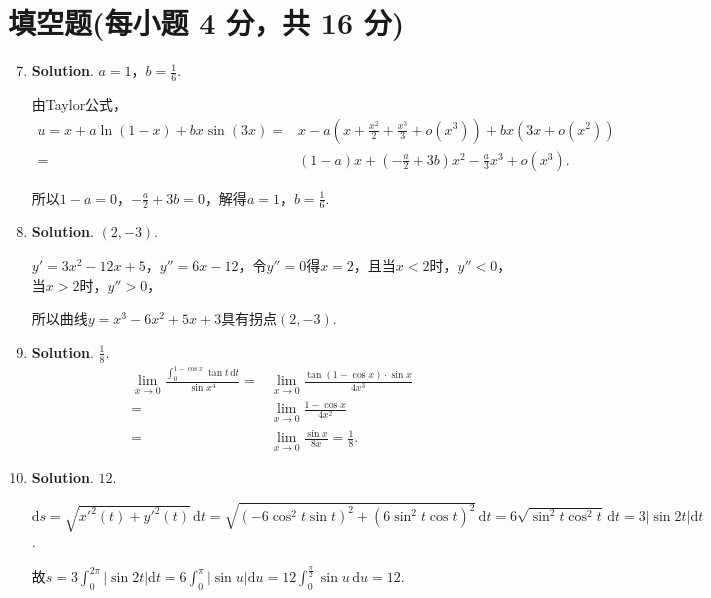 \documentclass[../Main.tex]{subfiles}
\begin{document}
\section{填空题(每小题 4 分，共 16 分)}
\begin{enumerate}
    \setcounter{enumi}{6}
    \item \textbf{Solution}. $a=1$，$b=\frac{1}{6}$.

          由Taylor公式，
          \[
              \begin{aligned}
                  u = x+a\ln(1-x)+bx\sin(3x) = & x-a\left(x+\frac{x^2}{2}+\frac{x^3}{3}+o(x^{3})\right)+bx\left(3x+o(x^{2})\right) \\
                  =                            & (1-a)x+\left(-\frac{a}{2}+3b\right)x^{2}-\frac{a}{3}x^{3}+o(x^{3}).
              \end{aligned}
          \]

          所以$1-a=0$，$-\frac{a}{2}+3b=0$，解得$a=1$，$b=\frac{1}{6}$.

    \item \textbf{Solution}. $(2,-3)$.

          $y'=3x^{2}-12x+5$，$y''=6x-12$，令$y''=0$得$x=2$，且当$x<2$时，$y''<0$，当$x
              >2$时，$y''>0$，

          所以曲线$y=x^{3}-6x^{2}+5x+3$具有拐点$(2,-3)$.

    \item \textbf{Solution}. $\frac{1}{8}$.
          \[
              \begin{aligned}
                  \lim_{x\to0}\frac{\displaystyle\int_{0}^{1-\cos x}\tan t\,\mathrm{d}t}{\sin x^4}= & \lim_{x\to0}\frac{\tan(1-\cos x)\cdot \sin x}{4x^3} \\
                  =                                                                                 & \lim_{x\to0}\frac{1-\cos x}{4x^2}                   \\
                  =                                                                                 & \lim_{x\to0}\frac{\sin x}{8x}= \frac{1}{8}.
              \end{aligned}
          \]

    \item \textbf{Solution}. $12$.

          $\mathrm{d}s=\sqrt{x'^{2}(t)+y'^{2}(t)}\,\mathrm{d}t=\sqrt{(-6\cos^{2} t\sin
                  t)^{2}+(6\sin^{2} t\cos t)^{2}}\,\mathrm{d}t=6\sqrt{\sin^{2} t\cos^{2} t}\,\mathrm{d}
              t=3|\sin 2t|\mathrm{d}t$.

          故$s=3\int_{0}^{2\pi}|\sin 2t|\mathrm{d}t=6\int_{0}^{\pi}|\sin u|\mathrm{d}
              u=12\int_{0}^{\frac{\pi}{2}}\sin u\,\mathrm{d}u=12$.
\end{enumerate}
\end{document}
